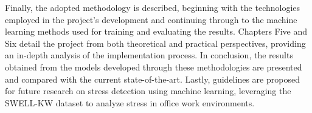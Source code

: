 \vspace{0.5cm}

Finally, the adopted methodology is described, beginning with the technologies employed in the project's development and continuing through to the machine learning methods used for training and evaluating the results. Chapters Five and Six detail the project from both theoretical and practical perspectives, providing an in-depth analysis of the implementation process. In conclusion, the results obtained from the models developed through these methodologies are presented and compared with the current state-of-the-art. Lastly, guidelines are proposed for future research on stress detection using machine learning, leveraging the SWELL-KW dataset to analyze stress in office work environments.
